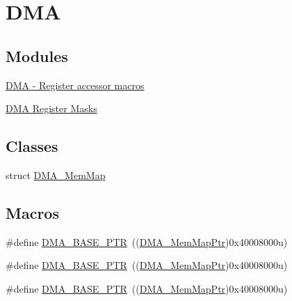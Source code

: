 \hypertarget{group___d_m_a___peripheral}{}\section{D\+MA}
\label{group___d_m_a___peripheral}
\subsection*{Modules}
\begin{DoxyCompactItemize}
\item 
\hyperlink{group___d_m_a___register___accessor___macros}{D\+M\+A -\/ Register accessor macros}
\item 
\hyperlink{group___d_m_a___register___masks}{D\+M\+A Register Masks}
\end{DoxyCompactItemize}
\subsection*{Classes}
\begin{DoxyCompactItemize}
\item 
struct \hyperlink{struct_d_m_a___mem_map}{D\+M\+A\+\_\+\+Mem\+Map}
\end{DoxyCompactItemize}
\subsection*{Macros}
\begin{DoxyCompactItemize}
\item 
\#define \hyperlink{group___d_m_a___peripheral_ga6997fbc1b1973e9f27170217a3bd6f22}{D\+M\+A\+\_\+\+B\+A\+S\+E\+\_\+\+P\+TR}~((\hyperlink{group___d_m_a___peripheral_ga160c27c95a39a9791079b32fe7e843a1}{D\+M\+A\+\_\+\+Mem\+Map\+Ptr})0x40008000u)
\item 
\#define \hyperlink{group___d_m_a___peripheral_ga6997fbc1b1973e9f27170217a3bd6f22}{D\+M\+A\+\_\+\+B\+A\+S\+E\+\_\+\+P\+TR}~((\hyperlink{group___d_m_a___peripheral_ga160c27c95a39a9791079b32fe7e843a1}{D\+M\+A\+\_\+\+Mem\+Map\+Ptr})0x40008000u)
\item 
\#define \hyperlink{group___d_m_a___peripheral_ga6997fbc1b1973e9f27170217a3bd6f22}{D\+M\+A\+\_\+\+B\+A\+S\+E\+\_\+\+P\+TR}~((\hyperlink{group___d_m_a___peripheral_ga160c27c95a39a9791079b32fe7e843a1}{D\+M\+A\+\_\+\+Mem\+Map\+Ptr})0x40008000u)
\end{DoxyCompactItemize}

